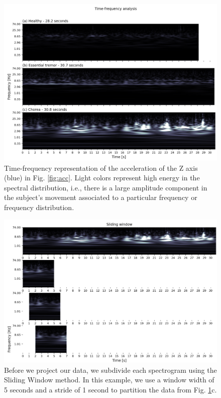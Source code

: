 \begin{figure}[ht]
\centering
\includegraphics[width=\linewidth]{figures/nemo/freq2.png}
\caption{Time-frequency representation of the acceleration of the Z axis (blue) in Fig. \ref{fig:acc}. Light colors represent high energy in the spectral distribution, i.e., there is a large amplitude component in the subject's movement associated to a particular frequency or frequency distribution.}
\label{fig:freq}
\end{figure}

\begin{figure}[ht]
\centering
\includegraphics[width=\linewidth]{figures/nemo/sliding.png}
\caption{Before we project our data, we subdivide each spectrogram using the Sliding Window method. In this example, we use a window width of 5 seconds and a stride of 1 second to partition the data from Fig. \ref{fig:freq}c.}
\label{fig:sliding}
\end{figure}


